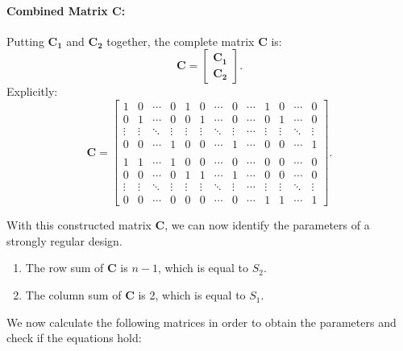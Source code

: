 \documentclass{article}
\begin{document}
\paragraph{Combined Matrix \( \mathbf{C} \):}

Putting \( \mathbf{C_1} \) and \( \mathbf{C_2} \) together, the complete matrix \( \mathbf{C} \) is:
\[
\mathbf{C} = 
\begin{bmatrix}
\mathbf{C_1} \\ 
\mathbf{C_2}
\end{bmatrix}.
\]
Explicitly:
\[
\mathbf{C} = 
\begin{bmatrix}
1 & 0 & \cdots & 0 & 1 & 0 & \cdots & 0 & \cdots & 1 & 0 & \cdots & 0 \\
0 & 1 & \cdots & 0 & 0 & 1 & \cdots & 0 & \cdots & 0 & 1 & \cdots & 0 \\
\vdots & \vdots & \ddots & \vdots & \vdots & \vdots & \ddots & \vdots & \cdots & \vdots & \vdots & \ddots & \vdots \\
0 & 0 & \cdots & 1 & 0 & 0 & \cdots & 1 & \cdots & 0 & 0 & \cdots & 1 \\ \\
1 & 1 & \cdots & 1 & 0 & 0 & \cdots & 0 & \cdots & 0 & 0 & \cdots & 0 \\
0 & 0 & \cdots & 0 & 1 & 1 & \cdots & 1 & \cdots & 0 & 0 & \cdots & 0 \\
\vdots & \vdots & \ddots & \vdots & \vdots & \vdots & \ddots & \vdots & \cdots & \vdots & \vdots & \ddots & \vdots \\
0 & 0 & \cdots & 0 & 0 & 0 & \cdots & 0 & \cdots & 1 & 1 & \cdots & 1
\end{bmatrix}.
\]

With this constructed matrix \(\mathbf{C}\), we can now identify the parameters of a strongly regular design.

\begin{enumerate}
    \item The row sum of \(\mathbf{C}\) is \(n-1\), which is equal to \(S_2\).
    \item The column sum of \(\mathbf{C}\) is 2, which is equal to \(S_1\).
\end{enumerate}

We now calculate the following matrices in order to obtain the parameters and check if the equations hold:
\end{document}
